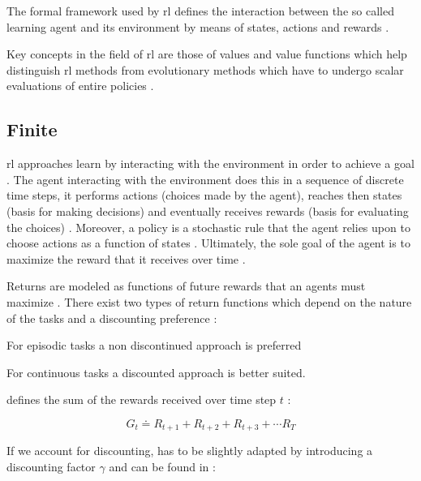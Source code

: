 The formal framework used by \gls{rl} defines the interaction between the so called learning agent and its environment by means of states, actions and rewards \citep[p. 15]{Sutton2017}.

Key concepts in the field of \gls{rl} are those of values and value functions which help distinguish \gls{rl} methods from evolutionary methods which have to undergo scalar evaluations of entire policies \citep[p. 15]{Sutton2017}.

\subsection{Finite }

\gls{rl} approaches learn by interacting with the environment in order to achieve a goal \citep{Sutton2017}. The agent interacting with the environment does this in a sequence of discrete time steps, it performs actions (choices made by the agent), reaches then states (basis for making decisions) and eventually receives rewards (basis for evaluating the choices) \citep[p. 73]{Sutton2017}. Moreover, a policy is a stochastic rule that the agent relies upon to choose actions as a function of states \citep[p. 73]{Sutton2017}. Ultimately, the sole goal of the agent is to maximize the reward that it receives over time \citep[p. 73]{Sutton2017}.

Returns are modeled as functions of future rewards that an agents must maximize \citep[p. 73]{Sutton2017}. There exist two types of return functions which depend on the nature of the tasks and a discounting preference \citep[p. 73]{Sutton2017}:
\begin{enumerate*}
	\item For episodic tasks a non discontinued approach is preferred
	\item For continuous tasks a discounted approach is better suited.
\end{enumerate*}

 defines the sum of the rewards received over time step $t$ \citep[p. 73]{Sutton2017}:

\begin{equation}
\label{eq:expected_return}
	G_t  \doteq R_{t+1} + R_{t+2} + R_{t+3} + \cdots R_{T}
\end{equation}

If we account for discounting,  has to be slightly adapted by introducing a discounting factor $\gamma$ and can be found in :


